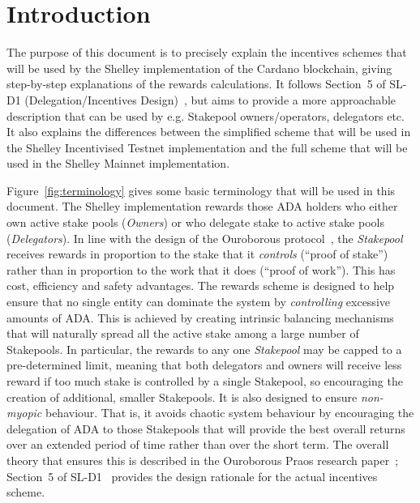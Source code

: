 \documentclass[11pt,a4paper,dvipsnames,twosided,final]{article}
\newcommand{\ada}{ADA{}}
\newcommand{\cardano}[1]{Cardano}
\begin{document}
\thispagestyle{empty}
\clearpage
\pagestyle{myheadings}
\renewcommand{\thepage}{\arabic{page}}
\setcounter{page}{1}
\section{Introduction}
\label{sec:introduction}

The purpose of this document is to precisely explain the incentives schemes that will be used by the Shelley implementation
of the \cardano{} blockchain, giving step-by-step explanations of the rewards calculations.
It follows Section~5 of SL-D1 (Delegation/Incentives Design)~\cite{delegation_design}, but aims to provide a more approachable
description that can be used by e.g. Stakepool owners/operators, delegators etc.
It also explains the differences between the simplified scheme that will be used in the Shelley Incentivised Testnet implementation and the
full scheme that will be used in the Shelley Mainnet implementation.

Figure~\ref{fig:terminology} gives some basic terminology that will be used in this document.
The Shelley implementation rewards those \ada{} holders who either own active stake pools
(\emph{Owners}) or who delegate stake to active stake pools (\emph{Delegators}).
In line with the design of the Ouroborous protocol~\cite{ouroboros_classic}, the \emph{Stakepool} receives
rewards in proportion to the stake that it \emph{controls} (``proof of
stake'') rather than in proportion to the work that it does (``proof of work'').
This has cost, efficiency and safety advantages.
The rewards scheme is designed to help ensure that no single entity can
dominate the system by \emph{controlling} excessive amounts of \ada{}.  This is achieved by creating intrinsic
balancing mechanisms that will naturally spread all the active stake among a large number of Stakepools.
In particular, the rewards to any one \emph{Stakepool} may be capped to a pre-determined limit,
meaning that both delegators and owners will receive less reward if too much stake is controlled by a single Stakepool,
so encouraging the creation of additional, smaller Stakepools.
It is also designed to ensure \emph{non-myopic} behaviour.  That is, it avoids chaotic system behaviour by encouraging the delegation of \ada{} to those Stakepools that will provide
the best overall returns over an extended period of time rather than over the short term.
The overall theory that ensures this is described in the Ouroborous Praos research
paper~\cite{ouroboros_praos}; Section~5 of SL-D1~\cite{delegation_design} provides the design rationale
for the actual incentives scheme.
\end{document}
